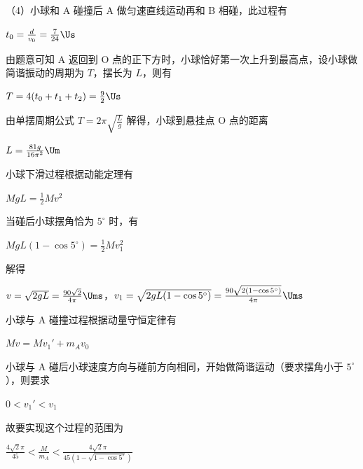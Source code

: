 \documentclass[\gkver]{gaokaozhenti}
\begin{document}
\begin{enumerate}
{（4）小球和 A 碰撞后 A 做匀速直线运动再和 B 相碰，此过程有

$t_{0} = \frac{d}{v_{0}} = \frac{7}{24} \Us$

由题意可知 A 返回到 O 点的正下方时，小球恰好第一次上升到最高点，设小球做简谐振动的周期为 $T$，摆长为 $L$，则有

$T = 4(t_{0} + t_{1} + t_{2}) = \frac{9}{2} \Us$

由单摆周期公式 $T = 2\pi\sqrt{\frac{L}{g}}$ 解得，小球到悬挂点 O 点的距离

$L = \frac{81g}{16\pi^{2}} \Um$

小球下滑过程根据动能定理有

$MgL = \frac{1}{2}Mv^{2}$

当碰后小球摆角恰为 $5^{\circ}$ 时，有

$MgL(1 - \cos5^{\circ}) = \frac{1}{2}Mv_{1}^{2}$

解得

$v = \sqrt{2gL} = \frac{90\sqrt{2}}{4\pi} \Ums$，$v_{1} = \sqrt{2gL(1 - \cos5^{\circ})} = \frac{90\sqrt{2(1 - \cos5^{\circ})}}{4\pi} \Ums$

小球与 A 碰撞过程根据动量守恒定律有

$Mv = Mv_{1}' + m_{A}v_{0}$

小球与 A 碰后小球速度方向与碰前方向相同，开始做简谐运动（要求摆角小于 $5^{\circ}$），则要求

$0 < v_{1}' < v_{1}$

故要实现这个过程的范围为

$\frac{4\sqrt{2}\pi}{45} < \frac{M}{m_{A}} < \frac{4\sqrt{2}\pi}{45(1 - \sqrt{1 - \cos5^{\circ}})}$
}

\end{enumerate}
\end{document}
